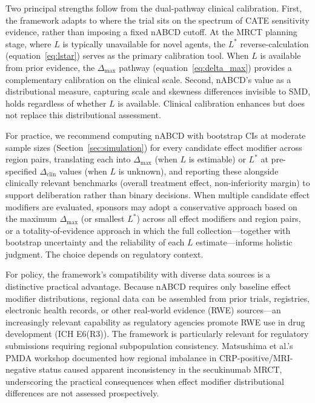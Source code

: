 \documentclass[AMA,Times1COL]{WileyNJDv5}
\begin{document}
Two principal strengths follow from the dual-pathway clinical calibration. First, the framework adapts to where the trial sits on the spectrum of CATE sensitivity evidence, rather than imposing a fixed nABCD cutoff. At the MRCT planning stage, where $L$ is typically unavailable for novel agents, the $L^*$ reverse-calculation (equation~\ref{eq:lstar}) serves as the primary calibration tool. When $L$ is available from prior evidence, the $\Delta_{\max}$ pathway (equation~\ref{eq:delta_max}) provides a complementary calibration on the clinical scale. Second, nABCD's value as a distributional measure, capturing scale and skewness differences invisible to SMD, holds regardless of whether $L$ is available. Clinical calibration enhances but does not replace this distributional assessment.

For practice, we recommend computing nABCD with bootstrap CIs at moderate sample sizes (Section~\ref{sec:simulation}) for every candidate effect modifier across region pairs, translating each into $\Delta_{\max}$ (when $L$ is estimable) or $L^*$ at pre-specified $\Delta_{\text{clin}}$ values (when $L$ is unknown), and reporting these alongside clinically relevant benchmarks (overall treatment effect, non-inferiority margin) to support deliberation rather than binary decisions. When multiple candidate effect modifiers are evaluated, sponsors may adopt a conservative approach based on the maximum $\Delta_{\max}$ (or smallest $L^*$) across all effect modifiers and region pairs, or a totality-of-evidence approach in which the full collection---together with bootstrap uncertainty and the reliability of each $L$ estimate---informs holistic judgment. The choice depends on regulatory context.

For policy, the framework's compatibility with diverse data sources is a distinctive practical advantage. Because nABCD requires only baseline effect modifier distributions, regional data can be assembled from prior trials, registries, electronic health records, or other real-world evidence (RWE) sources---an increasingly relevant capability as regulatory agencies promote RWE use in drug development (ICH E6(R3)). The framework is particularly relevant for regulatory submissions requiring regional subpopulation consistency.\cite{matsushima2024,song2025} Matsushima et al.'s\cite{matsushima2024} PMDA workshop documented how regional imbalance in CRP-positive/MRI-negative status caused apparent inconsistency in the secukinumab MRCT, underscoring the practical consequences when effect modifier distributional differences are not assessed prospectively.
\end{document}

